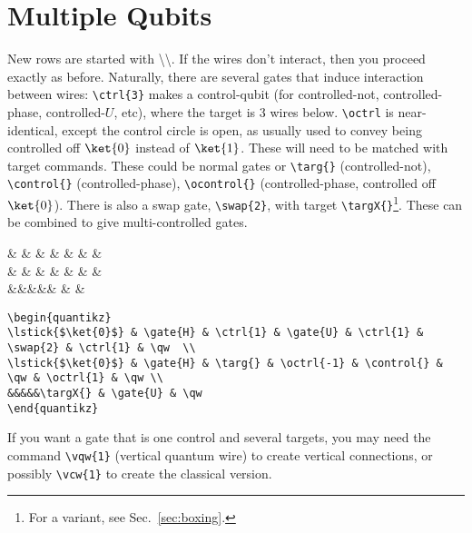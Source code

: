 \documentclass[aps,pra,10pt,nofootinbib]{revtex4}
\begin{document}
\section{Multiple Qubits}

New rows are started with \textbackslash\textbackslash. If the wires don't interact, then you proceed exactly as before. Naturally, there are several gates that induce interaction between wires: \verb!\ctrl{3}! makes a control-qubit (for controlled-not, controlled-phase, controlled-$U$, etc), where the target is 3 wires below. \verb!\octrl! is near-identical, except the control circle is open, as usually used to convey being controlled off $\ket{0}$ instead of $\ket{1}$. These will need to be matched with target commands. These could be normal gates or \verb!\targ{}! (controlled-not), \verb!\control{}! (controlled-phase), \verb!\ocontrol{}! (controlled-phase, controlled off $\ket{0}$). There is also a swap gate, \verb!\swap{2}!, with target \verb!\targX{}!\footnote{For a variant, see Sec.\ \ref{sec:boxing}.}. These can be combined to give multi-controlled gates.
\begin{Code}
\begin{center}
\begin{quantikz}
 &  &  &  &  &  &  & \qw  \\
 &  & \targ{} &  & \control{} & \qw &  & \qw \\
&&&&&\targX{} &  & \qw
\end{quantikz}
\end{center}
\tcblower
\begin{lstlisting}
\begin{quantikz}
\lstick{$\ket{0}$} & \gate{H} & \ctrl{1} & \gate{U} & \ctrl{1} & \swap{2} & \ctrl{1} & \qw  \\
\lstick{$\ket{0}$} & \gate{H} & \targ{} & \octrl{-1} & \control{} & \qw & \octrl{1} & \qw \\
&&&&&\targX{} & \gate{U} & \qw
\end{quantikz}
\end{lstlisting}
\end{Code}

If you want a gate that is one control and several targets, you may need the command \verb!\vqw{1}! (vertical quantum wire) to create vertical connections, or possibly \verb!\vcw{1}! to create the classical version.
\end{document}

